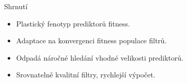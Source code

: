 \documentclass[14pt]{beamer}
\begin{document}
\begin{frame}{Shrnutí}
    \begin{itemize}
        \item Plastický fenotyp prediktorů fitness.
        \item Adaptace na konvergenci fitness populace filtrů.
        \item Odpadá náročné hledání vhodné velikosti prediktorů.
    \end{itemize}
    \vskip1cm
    \begin{itemize}
        \item Srovnatelně kvalitní filtry, rychlejší výpočet.
    \end{itemize}
\end{frame}





\end{document}
